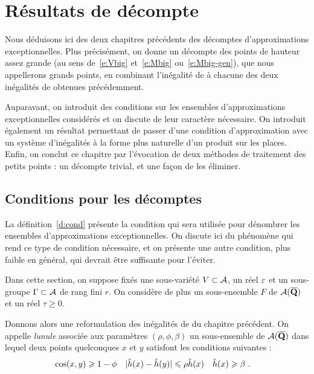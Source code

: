 \chapter{Résultats de décompte}
\label{chap:union}

Nous déduisons ici des deux chapitres précédents des décomptes
d'approximations exceptionnelles. Plus précisément, on donne un décompte des
points de hauteur assez grande (au sens de~\eqref{e:Vbig} et~\eqref{e:Mbig}
ou~\eqref{e:Mbig-gen}), que nous appellerons grands points, en combinant
l'inégalité de  à chacune des deux inégalités de 
obtenues précédemment.

Auparavant, on introduit des conditions sur les ensembles d'approximations
exceptionnelles considérés et on discute de leur caractère nécessaire. On
introduit également un résultat permettant de passer d'une condition
d'approximation avec un système d'inégalités à la forme plus naturelle d'un
produit sur les places. Enfin, on conclut ce chapitre par l'évocation de deux
méthodes de traitement des petits points : un décompte trivial, et une façon
de les éliminer.


\section{Conditions pour les décomptes}
\label{sec:obstruction}

La définition~\vref{d:cond} présente la condition qui sera utilisée pour
dénombrer les ensembles d'approximations exceptionnelles. On discute ici du
phénomène qui rend ce type de condition nécessaire, et on présente une autre
condition, plus faible en général, qui devrait être suffisante pour l'éviter.

Dans cette section, on suppose fixés une sous-variété \( V \subset \mathcal A \),
un réel \( \varepsilon \) et un sous-groupe \( \Gamma \subset \mathcal A \) de rang fini \( r
\).  On considère de plus un sous-ensemble \( F \) de \( \mathcal A(\overline{{\mathbf{Q}}}) \) et un
réel \( \tau \ge 0 \).

Donnons alors une reformulation des inégalités de  du chapitre
précédent. On appelle \emph{lunule} associée aux paramètres \( (\rho, \phi,
  \beta) \) un sous-ensemble de \( \mathcal A(\overline{{\mathbf{Q}}}) \) dans lequel deux points
quelconques \( x \) et \( y \) satisfont les conditions suivantes :
\begin{align}
  \cos(x, y) & \geqslant 1 - \phi
  &
  \lvert \hat h (x) - \hat h (y) \rvert & \leqslant \rho \hat h (x)
  &
  \hat h (x) & \geqslant \beta
  \text{ .}
\end{align}

